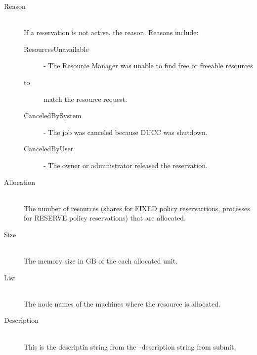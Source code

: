 \begin{description}
            \item[Reason] \hfill \\
              If a reservation is not active, the reason. Reasons include:
                \begin{description}
                    \item[ResourcesUnavailable] - The Resource Manager was unable to find free or freeable resources 
                    \item[to] match the resource request. 
                    \item[CanceledBySystem] - The job was canceled because DUCC was shutdown. 
                    \item[CanceledByUser] - The owner or administrator released the reservation. 
                \end{description}

            \item[Allocation] \hfill \\
              The number of resources (shares for FIXED policy reservartions, processes for
              RESERVE policy reservations) that are allocated.

            \item[Size] \hfill \\
              The memory size in GB of the each allocated unit.
              
            \item[List] \hfill \\
              The node names of the machines where the resource is allocated.
              
            \item[Description] \hfill \\
              This is the descriptin string from the --description string from submit.
        \end{description}
